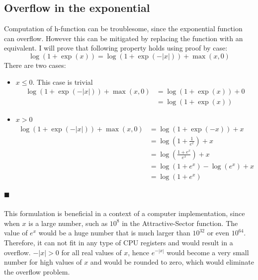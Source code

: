 \documentclass[a4paper]{article}
\newcommand*{\QEDA}{\hfill\ensuremath{\blacksquare}}%
\begin{document}
\subsection{Overflow in the exponential}
Computation of h-function can be troublesome, since the exponential function can
overflow. However this can be mitigated by replacing the function with an equivalent.
I will prove that following property holds using proof by case:
\[
\log (1+\exp (x))=\log (1+\exp (-|x|))+\max (x, 0)
\]
There are two cases:
\begin{itemize}
\item $x \leq 0$. This case is trivial
  \begin{align*}
    \log (1+\exp (-|x|))+\max (x, 0) &= \log (1+\exp (x)) + 0\\
    &= \log (1+\exp(x))
  \end{align*}
\item $x > 0$
  \begin{align*}
    \log (1+\exp (-|x|))+\max (x, 0) &= \log (1+\exp (-x)) + x\\
    &=\log \left(1 + \frac{1}{e^{x}}\right) + x\\
    &=\log \left(\frac{1 + e^{x}}{e^{x}}\right) + x\\
    &=\log (1 + e^{x}) - \log \left(e^{x}\right) + x\\
    &=\log (1 + e^{x})
  \end{align*}
\end{itemize}
\QEDA\\\\
This formulation is beneficial in a context of a computer implementation, since
when $x$ is a large number, such as $10^8$ in the Attractive-Sector function.
The value of $e^{x}$ would be a huge number that is much larger than
$10^{32}$ or even $10^{64}$. Therefore, it can not fit in any type of CPU
registers and would result in a overflow. $-|x| > 0$ for all real values of $x$,
hence $e^{-|x|}$ would become a very small number for high values of $x$ and
would be rounded to zero, which would eliminate the overflow problem.



\end{document}
